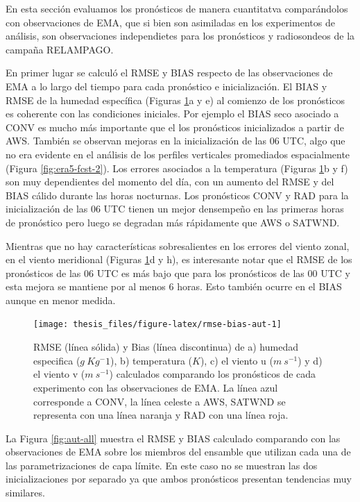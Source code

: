 \documentclass[12pt,oneside]{reedthesis}
\begin{document}
En esta sección evaluamos los pronósticos de manera cuantitatva comparándolos con observaciones de EMA, que si bien son asimiladas en los experimentos de análisis, son observaciones independietes para los pronósticos y radiosondeos de la campaña RELAMPAGO.

En primer lugar se calculó el RMSE y BIAS respecto de las observaciones de EMA a lo largo del tiempo para cada pronóstico e inicialización. El BIAS y RMSE de la humedad específica (Figuras \ref{fig:rmse-bias-aut}a y e) al comienzo de los pronósticos es coherente con las condiciones iniciales. Por ejemplo el BIAS seco asociado a CONV es mucho más importante que el los pronósticos inicializados a partir de AWS. También se observan mejoras en la inicialización de las 06 UTC, algo que no era evidente en el análisis de los perfiles verticales promediados espacialmente (Figura \ref{fig:era5-fcst-2}). Los errores asociados a la temperatura (Figuras \ref{fig:rmse-bias-aut}b y f) son muy dependientes del momento del día, con un aumento del RMSE y del BIAS cálido durante las horas nocturnas. Los pronósticos CONV y RAD para la inicialización de las 06 UTC tienen un mejor densempeño en las primeras horas de pronóstico pero luego se degradan más rápidamente que AWS o SATWND.

Mientras que no hay características sobresalientes en los errores del viento zonal, en el viento meridional (Figuras \ref{fig:rmse-bias-aut}d y h), es interesante notar que el RMSE de los pronósticos de las 06 UTC es más bajo que para los pronósticos de las 00 UTC y esta mejora se mantiene por al menos 6 horas. Esto también ocurre en el BIAS aunque en menor medida.


\begin{figure}
\texttt{[image: thesis\_files/figure-latex/rmse-bias-aut-1]} \caption{RMSE (línea sólida) y Bias (línea discontinua) de a) humedad especifica (\(g\ Kg{^-1}\)), b) temperatura (\(K\)), c) el viento u (\(m\ s^{-1}\)) y d) el viento v (\(m\ s^{-1}\)) calculados comparando los pronósticos de cada experimento con las observaciones de EMA. La línea azul corresponde a CONV, la línea celeste a AWS, SATWND se representa con una línea naranja y RAD con una línea roja.}\label{fig:rmse-bias-aut}
\end{figure}
La Figura \ref{fig:aut-all} muestra el RMSE y BIAS calculado comparando con las observaciones de EMA sobre los miembros del ensamble que utilizan cada una de las parametrizaciones de capa límite. En este caso no se muestran las dos inicializaciones por separado ya que ambos pronósticos presentan tendencias muy similares.
\end{document}
